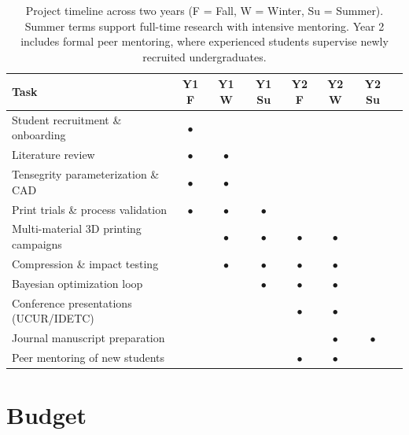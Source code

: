 \documentclass[11pt]{article}
\begin{document}
\begin{table}[ht]
\centering
\small
\begin{tabular}{@{}lccccccc@{}}
\toprule
\textbf{Task} & \textbf{Y1 F} & \textbf{Y1 W} & \textbf{Y1 Su} & \textbf{Y2 F} & \textbf{Y2 W} & \textbf{Y2 Su} \\
\midrule
Student recruitment \& onboarding    & \(\bullet\) &           &           &           &           &           \\
Literature review                     & \(\bullet\) & \(\bullet\) &           &           &           &           \\
Tensegrity parameterization \& CAD   & \(\bullet\) & \(\bullet\) &           &           &           &           \\
Print trials \& process validation   & \(\bullet\) & \(\bullet\) & \(\bullet\) &           &           &           \\
Multi-material 3D printing campaigns &             & \(\bullet\) & \(\bullet\) & \(\bullet\) & \(\bullet\) &           \\
Compression \& impact testing        &             & \(\bullet\) & \(\bullet\) & \(\bullet\) & \(\bullet\) &           \\
Bayesian optimization loop           &             &             & \(\bullet\) & \(\bullet\) & \(\bullet\) &           \\
Conference presentations (UCUR/IDETC)&             &             &             & \(\bullet\) & \(\bullet\) &           \\
Journal manuscript preparation       &             &             &             &             & \(\bullet\) & \(\bullet\) \\
Peer mentoring of new students       &             &             &             & \(\bullet\) & \(\bullet\) &           \\
\bottomrule
\end{tabular}
\caption{Project timeline across two years (F = Fall, W = Winter, Su = Summer).  Summer terms support full-time research with intensive mentoring. Year 2 includes formal peer mentoring, where experienced students supervise newly recruited undergraduates.}
\label{tab:timeline}
\end{table}

\section{Budget}






\newpage

\end{document}
